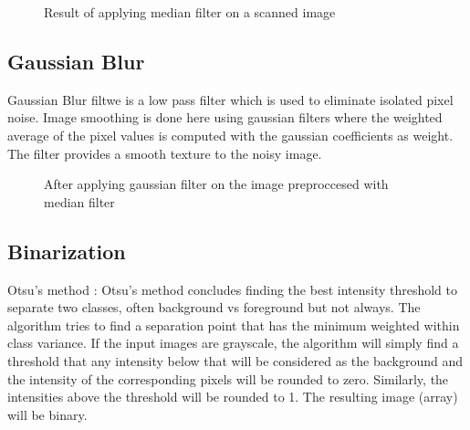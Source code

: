 \documentclass[9pt,twocolumn,twoside]{../../styles/osajnl}
\begin{document}
\begin{figure}[H]
\centering
{}
\caption{Result of applying median filter on a scanned image}
\label{fig:median}
\end{figure}


\subsection{Gaussian Blur}
Gaussian Blur filtwe is a low pass filter which is used to eliminate
isolated pixel noise. Image smoothing is done here using gaussian
filters where the weighted average of the pixel values is computed
with the gaussian coefficients as weight. The filter provides a smooth
texture to the noisy image.

\begin{figure}[H]
\centering
{}
\caption{After applying gaussian filter on the image preproccesed with median filter}
\end{figure}


\subsection{ Binarization}

Otsu’s method \cite{otsu1975threshold}: Otsu’s method concludes finding
the best intensity threshold to separate two classes, often background
vs foreground but not always. The algorithm tries to find a separation
point that has the minimum weighted within class variance.  If the
input images are grayscale, the algorithm will simply find a threshold
that any intensity below that will be considered as the background and
the intensity of the corresponding pixels will be rounded to
zero. Similarly, the intensities above the threshold will be rounded
to 1. The resulting image (array) will be binary.
\end{document}

